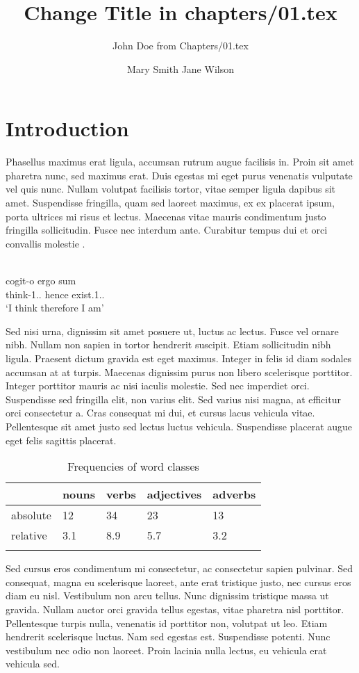 \documentclass[output=paper]{langsci/langscibook}
\title{Change Title in chapters/01.tex}
\author{%
 John Doe from Chapters/01.tex\affiliation{University of Eden} 
 \and 
 Mary Smith\affiliation{University of Pluto} 
 \lastand 
 Jane Wilson\affiliation{National Institute for Language}
}
\begin{document}
\section{Introduction} 
Phasellus maximus erat ligula, accumsan rutrum augue facilisis in. Proin sit amet pharetra nunc, sed maximus erat. Duis egestas mi eget purus venenatis vulputate vel quis nunc. Nullam volutpat facilisis tortor, vitae semper ligula dapibus sit amet. Suspendisse fringilla, quam sed laoreet maximus, ex ex placerat ipsum, porta ultrices mi risus et lectus. Maecenas vitae mauris condimentum justo fringilla sollicitudin. Fusce nec interdum ante. Curabitur tempus dui et orci convallis molestie \citep{Chomsky1957}.

 \ea\label{ex:1:descartes}
\\
\gll cogit-o ergo sum \\
     think-1{\sg}.{\prs}.{\ind} hence exist.1{\sg}.{\prs}.{\ind}\\
\glt `I think therefore I am'
\z

Sed nisi urna, dignissim sit amet posuere ut, luctus ac lectus. Fusce vel ornare nibh. Nullam non sapien in tortor hendrerit suscipit. Etiam sollicitudin nibh ligula. Praesent dictum gravida est eget maximus. Integer in felis id diam sodales accumsan at at turpis. Maecenas dignissim purus non libero scelerisque porttitor. Integer porttitor mauris ac nisi iaculis molestie. Sed nec imperdiet orci. Suspendisse sed fringilla elit, non varius elit. Sed varius nisi magna, at efficitur orci consectetur a. Cras consequat mi dui, et cursus lacus vehicula vitae. Pellentesque sit amet justo sed lectus luctus vehicula. Suspendisse placerat augue eget felis sagittis placerat. 


\begin{table}
\caption{Frequencies of word classes}
\label{tab:1:frequencies}
 \begin{tabular}{lllll} %
  \lsptoprule
            & nouns & verbs & adjectives & adverbs\\ %
  \midrule
  absolute  &   12 &    34  &    23     & 13\\
  relative  &   3.1 &   8.9 &    5.7    & 3.2\\
  \lspbottomrule
 \end{tabular}
\end{table}


Sed cursus eros condimentum mi consectetur, ac consectetur sapien pulvinar. Sed consequat, magna eu scelerisque laoreet, ante erat tristique justo, nec cursus eros diam eu nisl. Vestibulum non arcu tellus. Nunc dignissim tristique massa ut gravida. Nullam auctor orci gravida tellus egestas, vitae pharetra nisl porttitor. Pellentesque turpis nulla, venenatis id porttitor non, volutpat ut leo. Etiam hendrerit scelerisque luctus. Nam sed egestas est. Suspendisse potenti. Nunc vestibulum nec odio non laoreet. Proin lacinia nulla lectus, eu vehicula erat vehicula sed. 
\end{document}
